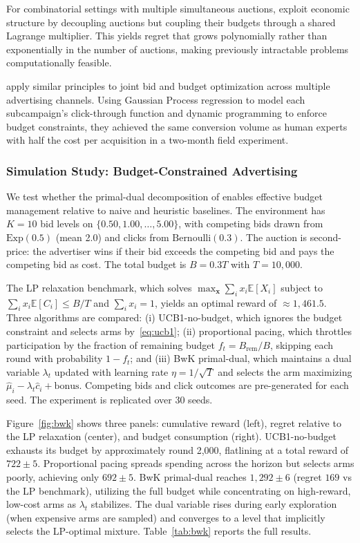 For combinatorial settings with multiple simultaneous auctions, \citet{Sankararaman2018} exploit economic structure by decoupling auctions but coupling their budgets through a shared Lagrange multiplier. This yields regret that grows polynomially rather than exponentially in the number of auctions, making previously intractable problems computationally feasible.

\citet{Nuara2018} apply similar principles to joint bid and budget optimization across multiple advertising channels. Using Gaussian Process regression to model each subcampaign's click-through function and dynamic programming to enforce budget constraints, they achieved the same conversion volume as human experts with half the cost per acquisition in a two-month field experiment.

\subsubsection{Simulation Study: Budget-Constrained Advertising}
\label{sec:sim_bwk}

We test whether the primal-dual decomposition of \citet{Badanidiyuru2013} enables effective budget management relative to naive and heuristic baselines. The environment has $K = 10$ bid levels on $\{0.50, 1.00, \ldots, 5.00\}$, with competing bids drawn from $\text{Exp}(0.5)$ (mean 2.0) and clicks from $\text{Bernoulli}(0.3)$. The auction is second-price: the advertiser wins if their bid exceeds the competing bid and pays the competing bid as cost. The total budget is $B = 0.3T$ with $T = 10{,}000$.

The LP relaxation benchmark, which solves $\max_{\mathbf{x}} \sum_i x_i \mathbb{E}[X_i]$ subject to $\sum_i x_i \mathbb{E}[C_i] \leq B/T$ and $\sum_i x_i = 1$, yields an optimal reward of $\approx 1{,}461.5$. Three algorithms are compared: (i) UCB1-no-budget, which ignores the budget constraint and selects arms by~\eqref{eq:ucb1}; (ii) proportional pacing, which throttles participation by the fraction of remaining budget $f_t = B_{\text{rem}} / B$, skipping each round with probability $1 - f_t$; and (iii) BwK primal-dual, which maintains a dual variable $\lambda_t$ updated with learning rate $\eta = 1/\sqrt{T}$ and selects the arm maximizing $\hat{\mu}_i - \lambda_t \hat{c}_i + \text{bonus}$. Competing bids and click outcomes are pre-generated for each seed. The experiment is replicated over 30 seeds.

Figure~\ref{fig:bwk} shows three panels: cumulative reward (left), regret relative to the LP relaxation (center), and budget consumption (right). UCB1-no-budget exhausts its budget by approximately round 2{,}000, flatlining at a total reward of $722 \pm 5$. Proportional pacing spreads spending across the horizon but selects arms poorly, achieving only $692 \pm 5$. BwK primal-dual reaches $1{,}292 \pm 6$ (regret $169$ vs the LP benchmark), utilizing the full budget while concentrating on high-reward, low-cost arms as $\lambda_t$ stabilizes. The dual variable rises during early exploration (when expensive arms are sampled) and converges to a level that implicitly selects the LP-optimal mixture. Table~\ref{tab:bwk} reports the full results.

